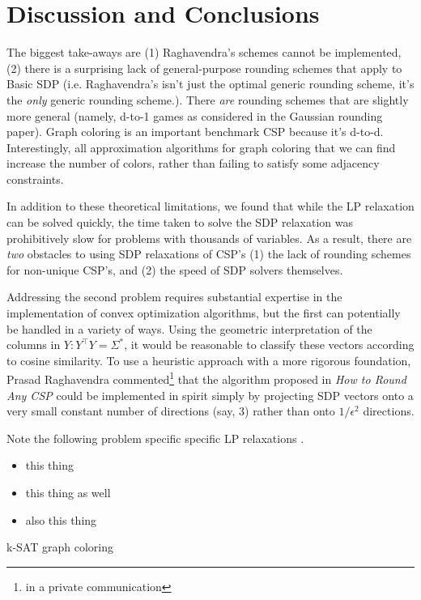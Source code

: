\section{Discussion and Conclusions}	
	The biggest take-aways are (1) Raghavendra's schemes cannot be implemented, (2) there is a surprising lack of general-purpose rounding schemes that apply to Basic SDP (i.e. Raghavendra's isn't just the optimal generic rounding scheme, it's the \textit{only} generic rounding scheme.). There \textit{are} rounding schemes that are slightly more general (namely, d-to-1 games as considered in the Gaussian rounding paper). Graph coloring is an important benchmark CSP because it's d-to-d. Interestingly, all approximation algorithms for graph coloring that we can find increase the number of colors, rather than failing to satisfy some adjacency constraints. 
	
	In addition to these theoretical limitations, we found that while the LP relaxation can be solved quickly, the time taken to solve the SDP relaxation was prohibitively slow for problems with thousands of variables. As a result, there are \textit{two} obstacles to using SDP relaxations of CSP's (1) the lack of rounding schemes for non-unique CSP's, and (2) the speed of SDP solvers themselves.
	
	Addressing the second problem requires substantial expertise in the implementation of convex optimization algorithms, but the first can potentially be handled in a variety of ways. Using the geometric interpretation of the columns in $Y : Y^\intercal Y = \Sigma^*$, it would be reasonable to classify these vectors according to cosine similarity. To use a heuristic approach with a more rigorous foundation, Prasad Raghavendra commented\footnote{in a private communication} that the algorithm proposed in \textit{How to Round Any CSP} could be implemented in spirit simply by projecting SDP vectors onto a very small constant number of directions (say, 3) rather than onto $1/\epsilon^2$ directions.

Note the following problem specific specific LP relaxations \cite{GoeWil94,Asa97,Yan94}.
\begin{itemize}
\item this thing
\item this thing as well
\item also this thing
\end{itemize}
k-SAT
graph coloring